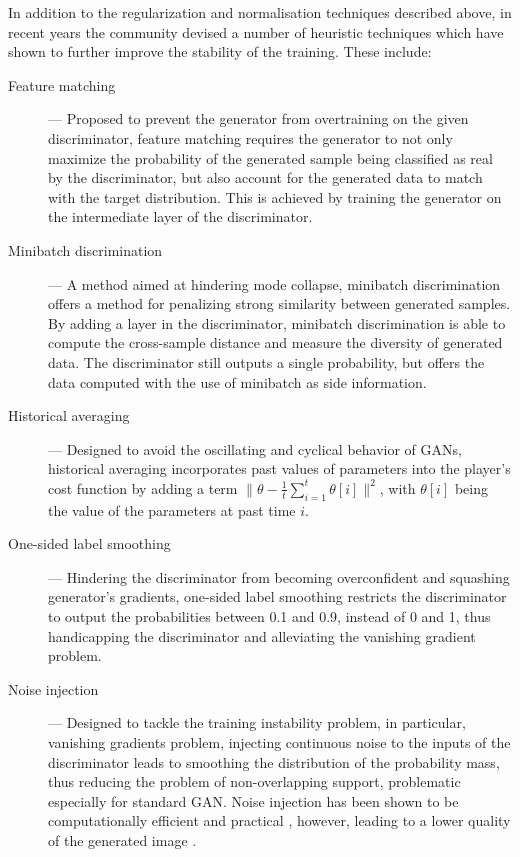 In addition to the regularization and normalisation techniques described above, in recent years the community devised a number of heuristic techniques which have shown to further improve the stability of the training. These include:
\begin{description}
    \item[Feature matching ] --- Proposed to prevent the generator from overtraining on the given discriminator, feature matching requires the generator to not only maximize the probability of the generated sample being classified as real by the discriminator, but also account for the generated data to match with the target distribution. This is achieved by training the generator on the intermediate layer of the discriminator.
    \item[Minibatch discrimination ] --- A method aimed at hindering mode collapse, minibatch discrimination offers a method for penalizing strong similarity between generated samples. By adding a layer in the discriminator, minibatch discrimination is able to compute the cross-sample distance and measure the diversity of generated data. The discriminator still outputs a single probability, but offers the data computed with the use of minibatch as side information.
    \item[Historical averaging ] --- Designed to avoid the oscillating and cyclical behavior of GANs, historical averaging incorporates past values of parameters into the player's cost function by adding a term $\parallel\theta - \frac{1}{t}\sum_{i=1}^{t}\theta[i]\parallel^{2}$, with $\theta[i]$ being the value of the parameters at past time $i$.
    \item[One-sided label smoothing ] --- Hindering the discriminator from becoming overconfident and squashing generator's gradients, one-sided label smoothing restricts the discriminator to output the probabilities between 0.1 and 0.9, instead of 0 and 1, thus handicapping the discriminator and alleviating the vanishing gradient problem. 
    \item[Noise injection ] --- Designed to tackle the training instability problem, in particular, vanishing gradients problem, injecting continuous noise to the inputs of the discriminator leads to smoothing the distribution of the probability mass, thus reducing the problem of non-overlapping support, problematic especially for standard GAN. Noise injection has been shown to be computationally efficient and practical , however, leading to a lower quality of the generated image .
\end{description}

